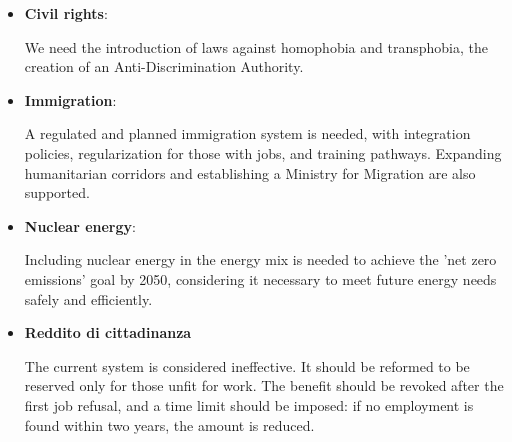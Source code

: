 \label{Third_Pole_opinions}

\begin{itemize}
    \item \textbf{Civil rights}:
        \begin{tcolorbox}[prompt]
            [SUPPORTIVE] We need the introduction of laws against homophobia and transphobia, the creation of an Anti-Discrimination Authority.
        \end{tcolorbox}

    \item \textbf{Immigration}:
        \begin{tcolorbox}[prompt]
            [SUPPORTIVE] A regulated and planned immigration system is needed, with integration policies, regularization for those with jobs, and training pathways. Expanding humanitarian corridors and establishing a Ministry for Migration are also supported.
        \end{tcolorbox}
        
    \item \textbf{Nuclear energy}: 
        \begin{tcolorbox}[prompt]
            [SUPPORTIVE] Including nuclear energy in the energy mix is needed to achieve the 'net zero emissions' goal by 2050, considering it necessary to meet future energy needs safely and efficiently.
        \end{tcolorbox}
    
    \item \textbf{Reddito di cittadinanza}
        \begin{tcolorbox}[prompt]
            [OPPOSED] The current system is considered ineffective. It should be reformed to be reserved only for those unfit for work. The benefit should be revoked after the first job refusal, and a time limit should be imposed: if no employment is found within two years, the amount is reduced.
        \end{tcolorbox}
\end{itemize}